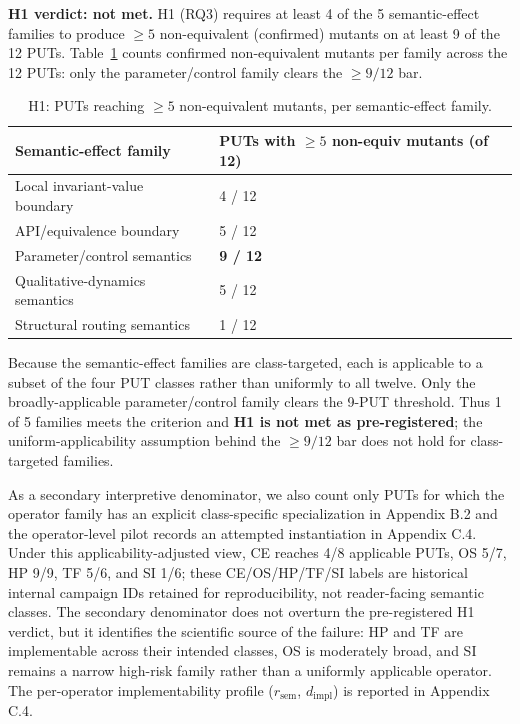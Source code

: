 \documentclass[manuscript,screen,review]{acmart}
\begin{document}
\textbf{H1 verdict: not met.} H1 (RQ3) requires at least 4 of the 5
semantic-effect families to produce $\geq 5$ non-equivalent
(confirmed) mutants on at least 9 of the 12 PUTs. Table~\ref{tab:p2-32}
counts confirmed non-equivalent mutants per family across the 12 PUTs:
only the parameter/control family clears the $\geq 9/12$ bar.

{%
\begin{longtable}[]{@{}ll@{}}
\caption{H1: PUTs reaching $\geq 5$ non-equivalent mutants, per semantic-effect family.}\label{tab:p2-32}\\
\toprule\noalign{}
Semantic-effect family & PUTs with $\geq 5$ non-equiv mutants (of 12) \\
\midrule\noalign{}
\endfirsthead
\endhead
\bottomrule\noalign{}
\endlastfoot
Local invariant-value boundary & 4 / 12 \\
API/equivalence boundary & 5 / 12 \\
Parameter/control semantics & \textbf{9 / 12} \\
Qualitative-dynamics semantics & 5 / 12 \\
Structural routing semantics & 1 / 12 \\
\end{longtable}
}

Because the semantic-effect families are class-targeted, each is applicable
to a subset of the four PUT classes rather than uniformly to all twelve.
Only the broadly-applicable parameter/control family clears the 9-PUT
threshold. Thus 1 of 5 families meets the criterion and \textbf{H1 is
not met as pre-registered}; the uniform-applicability assumption behind
the $\geq 9/12$ bar does not hold for class-targeted families.

As a secondary interpretive denominator, we also count only PUTs for
which the operator family has an explicit class-specific specialization
in Appendix B.2 and the operator-level pilot records an attempted
instantiation in Appendix C.4. Under this applicability-adjusted view,
CE reaches 4/8 applicable PUTs, OS 5/7, HP 9/9, TF 5/6, and SI 1/6; these
CE/OS/HP/TF/SI labels are historical internal campaign IDs retained for
reproducibility, not reader-facing semantic classes. The
secondary denominator does not overturn the pre-registered H1 verdict,
but it identifies the scientific source of the failure: HP and TF are
implementable across their intended classes, OS is moderately broad, and
SI remains a narrow high-risk family rather than a uniformly applicable
operator. The per-operator implementability profile ($r_{\mathrm{sem}}$,
$d_{\mathrm{impl}}$) is reported in Appendix C.4.
\end{document}
